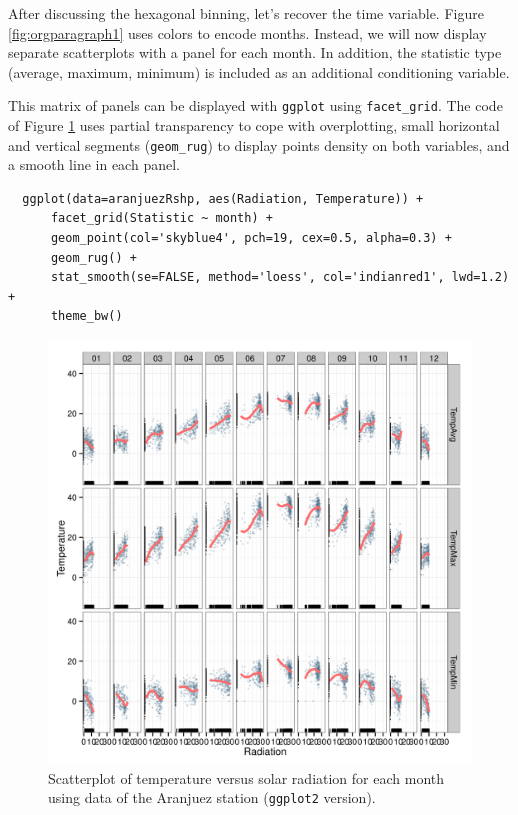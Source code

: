 \documentclass[smallroyalvopaper]{memoir}
\begin{document}
After discussing the hexagonal binning, let's recover the time
variable. Figure \ref{fig:orgparagraph1} uses colors to encode
months. Instead, we will now display separate scatterplots with a
panel for each month. In addition, the statistic type (average,
maximum, minimum) is included as an additional conditioning variable.

This matrix of panels can be displayed with \texttt{ggplot} using
\texttt{facet\_grid}. The code of Figure \ref{fig:orgparagraph4} uses partial
transparency to cope with overplotting, small horizontal and vertical
segments (\texttt{geom\_rug}) to display points density on both variables, and
a smooth line in each panel.
\lstset{language=R,label= ,caption= ,captionpos=b,numbers=none}
\begin{lstlisting}
  ggplot(data=aranjuezRshp, aes(Radiation, Temperature)) +
      facet_grid(Statistic ~ month) +
      geom_point(col='skyblue4', pch=19, cex=0.5, alpha=0.3) +
      geom_rug() +
      stat_smooth(se=FALSE, method='loess', col='indianred1', lwd=1.2) +
      theme_bw()
\end{lstlisting}

\begin{figure}[htb]
\centering
\includegraphics[width=.9\linewidth]{figs/aranjuezFacetGrid.png}
\caption{\label{fig:orgparagraph4}
Scatterplot of temperature versus solar radiation for each month using data of the Aranjuez station (\texttt{ggplot2} version).}
\end{figure}
\end{document}
